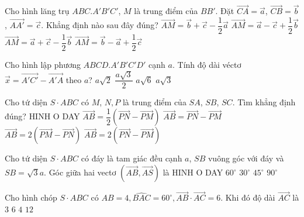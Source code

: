 \begin{ex}
	Cho hình lăng trụ $ABC.A'B'C'$, $M$ là trung điểm của $BB'$. Đặt $\vec{CA}=\vec{a}$, $\vec{CB}=\vec{b}$, $\vec{AA'}=\vec{c}$. Khẳng định nào sau đây đúng?
	\choice
	{$\vec{AM}=\vec{b}+\vec{c}-\dfrac{1}{2}\vec{a}$}
	{$\vec{AM}=\vec{a}-\vec{c}+\dfrac{1}{2}\vec{b}$}
	{$\vec{AM}=\vec{a}+\vec{c}-\dfrac{1}{2}\vec{b}$}
	{\True $\vec{AM}=\vec{b}-\vec{a}+\dfrac{1}{2}\vec{c}$}
\end{ex}
\begin{ex}
	Cho hình lập phương $ABCD.A'B'C'D'$ cạnh $a$. Tính độ dài véctơ $\vec{x}=\vec{A'C'}-\vec{A'A}$ theo $a$?
	\choice
	{$a\sqrt{2}$}
	{$\dfrac{a\sqrt{3}}{2}$}
	{$a\sqrt{6}$}
	{\True $a\sqrt{3}$}
\end{ex}
\begin{ex}
	Cho tứ diện $S \cdot ABC$ có $M$, $N,P$ là trung điểm của $SA$, $SB$, $SC$. Tìm khẳng định đúng?
	{\centering\color{red} HINH O DAY}
	\choice
	{$\vec{AB}=\dfrac{1}{2}\left(\vec{PN}-\vec{PM}\right)$}
	{$\vec{AB}=\vec{PN}-\vec{PM}$}
	{$\vec{AB}=2\left(\vec{PM}-\vec{PN}\right)$}
	{\True $\vec{AB}=2\left(\vec{PN}-\vec{PM}\right)$}
\end{ex}
\begin{ex}
	Cho tứ diện $S \cdot ABC$ có đáy là tam giác đều cạnh $a$, $SB$ vuông góc với đáy và $SB=\sqrt{3}a$. Góc giữa hai vectơ  $\left(\vec{AB},\vec{AS}\right)$ là
	{\centering\color{red} HINH O DAY}
	\choice
	{\True $60^\circ$}
		{$30^\circ$}
		{$45^\circ$}
		{$90^\circ$}
\end{ex}
\begin{ex}
	Cho hình chóp $S \cdot ABC$ có $AB=4,\widehat{BAC}={{60}^\circ},\vec{AB} \cdot \vec{AC}=6$. Khi đó độ dài $\vec{AC}$ là
	\choice
	{\True $3$}
	{$6$}
	{$4$}
	{$12$}
\end{ex}
